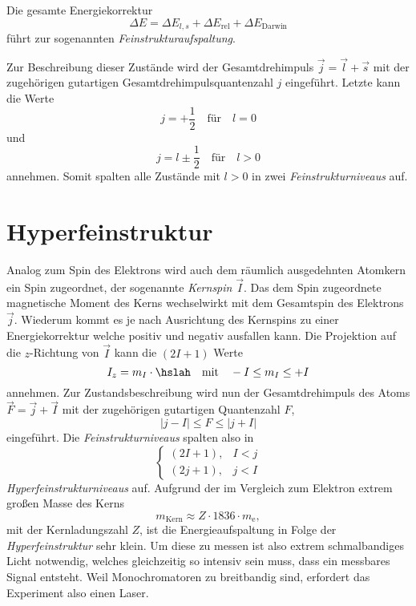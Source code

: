 \documentclass[../bericht.tex]{subfiles}
\begin{document}
      Die gesamte Energiekorrektur
      \begin{equation*}
        \Delta E = \Delta E_{l,s} + \Delta E_\mathrm{rel} + \Delta E_\mathrm{Darwin}
      \end{equation*}
      führt zur sogenannten \textit{Feinstrukturaufspaltung}.
      \medskip

      Zur Beschreibung dieser Zustände wird der Gesamtdrehimpuls $\vec{j}=\vec{l}+\vec{s}$ mit der zugehörigen gutartigen Gesamtdrehimpulsquantenzahl $j$ eingeführt. Letzte kann die Werte
      \begin{equation*}
        j=+\frac{1}{2} \quad\text{für}\quad l=0
      \end{equation*}
      und
      \begin{equation*}
        j=l\pm \frac{1}{2}\quad\text{für}\quad l>0
      \end{equation*}
      annehmen. Somit spalten alle Zustände mit $l>0$ in zwei \textit{Feinstrukturniveaus} auf.


    \section{Hyperfeinstruktur}
    \label{sec:hyperfeinstruktur}

      Analog zum Spin des Elektrons wird auch dem räumlich ausgedehnten Atomkern ein Spin zugeordnet, der sogenannte \textit{Kernspin} $\vec{I}$. Das dem Spin zugeordnete magnetische Moment des Kerns wechselwirkt mit dem Gesamtspin des Elektrons $\vec{j}$. Wiederum kommt es je nach Ausrichtung des Kernspins zu einer Energiekorrektur welche positiv und negativ ausfallen kann. Die Projektion auf die $z$-Richtung von $\vec{I}$ kann die $(2I + 1)$ Werte
      \begin{equation*}
        I_z=m_I \cdot \hslah\quad\text{mit}\quad -I\le m_I \le +I
      \end{equation*}
      annehmen. Zur Zustandsbeschreibung wird nun der Gesamtdrehimpuls des Atoms $\vec{F}=\vec{j}+\vec{I}$ mit der zugehörigen gutartigen Quantenzahl $F$,
      \begin{equation*}
        |j-I| \le F\le |j + I|
      \end{equation*}
      eingeführt. Die \textit{Feinstrukturniveaus} spalten also in
      \begin{equation*}
        \begin{cases}
            (2I+1), & I<j\\
            (2j+1), & j<I
        \end{cases}
      \end{equation*}
      \textit{Hyperfeinstrukturniveaus} auf. Aufgrund der im Vergleich zum Elektron extrem großen Masse des Kerns
      \begin{equation*}
        m_\mathrm{Kern}\approx Z\cdot 1836 \cdot m_\mathrm{e},
      \end{equation*}
      mit der Kernladungszahl $Z$, ist die Energieaufspaltung in Folge der \textit{Hyperfeinstruktur} sehr klein. Um diese zu messen ist also extrem schmalbandiges Licht notwendig, welches gleichzeitig so intensiv sein muss, dass ein messbares Signal entsteht. Weil Monochromatoren zu breitbandig sind, erfordert das Experiment also einen Laser.
\end{document}
